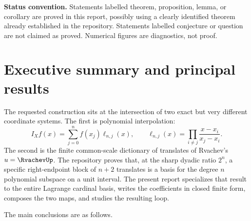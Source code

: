 \documentclass[11pt,oneside]{article}
\theoremstyle{definition}
\theoremstyle{remark}
\newcommand{\1}{\mathbf{1}}
\begin{document}
\medskip
\noindent\textbf{Status convention.}
Statements labelled theorem, proposition, lemma, or corollary are proved in
this report, possibly using a clearly identified theorem already established
in the repository.  Statements labelled conjecture or question are not
claimed as proved.  Numerical figures are diagnostics, not proof.

\tableofcontents
\newpage

\section{Executive summary and principal results}

The requested construction sits at the intersection of two exact but very
different coordinate systems.  The first is polynomial interpolation:
\[
 I_Xf(x)=\sum_{j=0}^n f(x_j)\ell_{n,j}(x),
 \qquad
 \ell_{n,j}(x)=\prod_{i\ne j}\frac{x-x_i}{x_j-x_i}.
\]
The second is the finite common-scale dictionary of translates of Rvachev's
$u=\RvachevUp$.  The repository proves that, at the sharp dyadic ratio $2^n$, a
specific right-endpoint block of $n+2$ translates is a basis for the degree
$n$ polynomial subspace on a unit interval.  The present report specializes
that result to the entire Lagrange cardinal basis, writes the coefficients in
closed finite form, composes the two maps, and studies the resulting loop.

The main conclusions are as follows.
\end{document}
